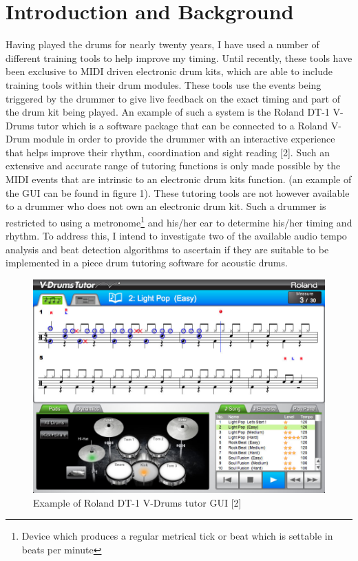 \documentclass[a4paper, 11pt]{article}
\begin{document}
\maketitle{} \section{Introduction and Background}
Having played the drums for nearly twenty years, I have used a number of different training tools to help improve my timing. Until recently, these tools have been exclusive to MIDI driven electronic drum kits, which are able to include training tools within their drum modules. These tools use the events being triggered by the drummer to give live feedback on the exact timing and part of the drum kit being played. An example of such a system is the Roland DT-1 V-Drums tutor which is a software package that can be connected to a Roland V-Drum module in order to provide the drummer with an interactive experience that helps improve their rhythm, coordination and sight reading [2]. Such an extensive and accurate range of tutoring functions is only made possible by the MIDI events that are intrinsic to an electronic drum kits function. (an example of the GUI can be found in figure 1). These tutoring tools are not however available to a drummer who does not own an electronic drum kit. Such a drummer is restricted to using a metronome\footnote{Device which produces a regular metrical tick or beat which is settable in beats per minute} and his/her ear to determine his/her timing and rhythm. To address this, I intend to investigate two of the available audio tempo analysis and beat detection algorithms to ascertain if they are suitable to be implemented in a piece drum tutoring software for acoustic drums.
\begin{figure}[h]
\caption{Example of Roland DT-1 V-Drums tutor GUI [2]}
	\centering
	\includegraphics[scale=0.25]{dt-1_ss_main_notation_gal}
\end{figure}
\end{document}
